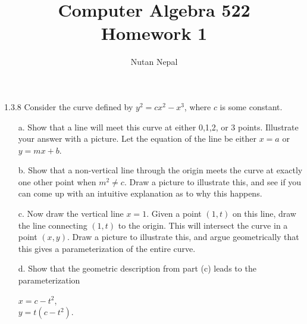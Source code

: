 \documentclass[12pt]{article}
\title{Computer Algebra 522\\
\large Homework 1
}
\author{Nutan Nepal}
\begin{document}
\maketitle
\makebox[\linewidth]{\rule{180mm}{1pt}}
\vspace{.1in}

1.3.8
Consider the curve defined by $y^2=cx^2-x^3$, where $c$ is some constant.
\begin{enumerate}
    \item[a.] Show that a line will meet this curve at either 0,1,2, or 3 points. Illustrate your answer with a picture. Let the equation of the line be either $x=a$ or $y=mx+b$.
    \begin{mybox}
        \vspace*{45mm}
    \end{mybox}
    \item[b.] Show that a non-vertical line through the origin meets the curve at exactly one other point when $m^2\neq c$. Draw a picture to illustrate this, and see if you can come up with an intuitive explanation as to why this happens.
    \begin{mybox}
        \vspace{45mm}
    \end{mybox}
    \item[c.] Now draw the vertical line $x=1$. Given a point $(1,t)$ on this line, draw the line connecting $(1,t)$ to the origin. This will intersect the curve in a point $(x,y)$. Draw a picture to illustrate this, and argue geometrically that this gives a parameterization of the entire curve.
    \begin{mybox}
        \vspace{60mm}
    \end{mybox}
    \item[d.] Show that the geometric description from part (c) leads to the parameterization
    \begin{center}
        $x = c-t^2$,\\
        $y = t(c-t^2)$.
    \end{center}
    \begin{mybox}
        \vspace{30mm}
    \end{mybox}
\end{enumerate}
\end{document}

